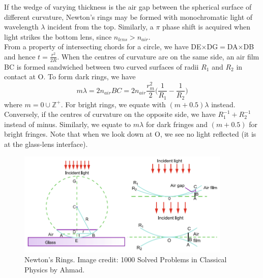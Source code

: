 \documentclass[a4paper]{article}
\begin{document}
\begin{eg}
If the wedge of varying thickness is the air gap between the spherical surface of different curvature, Newton’s rings may be formed with monochromatic light of wavelength $\lambda$ incident
from the top. Similarly, a $\pi$ phase shift is acquired when light strikes the bottom lens, since $n_{lens}>n_{air}$.\\[5pt]
From a property of intersecting chords for a circle, we have DE$\times$DG$=$DA$\times$DB and hence $t=\frac{r^2}{2R}$. When the centres of curvature are on the same side, an air film BC is formed sandwiched between two curved surfaces of radii $R_1$ and $R_2$ in contact at O. To form dark rings, we have
$$m\lambda=2n_{air}BC=2n_{air}\frac{r_m^2}{2}\bigg(\frac{1}{R_1}-\frac{1}{R_2}\bigg)$$
where $m=0\cup\mathbb{Z}^+$.  For bright rings, we equate with $(m+0.5)\lambda$ instead. Conversely, if the centres of curvature on the opposite side, we have $R_1^{-1}+R_2^{-1}$ instead of minus. Similarly, we equate to $m\lambda$ for dark fringes and $(m+0.5)$ for bright fringes. Note that when we look down at O, we see no light reflected (it is at the glass-lens interface).
\end{eg}
\begin{figure}[H]
    \centering
    \includegraphics[width=\linewidth,height=5cm]{newtonrings.PNG}
    \caption{Newton's Rings. Image credit: 1000 Solved Problems in Classical Physics by Ahmad.}
    \label{newtonrings}
\end{figure}
\newpage
\end{document}
